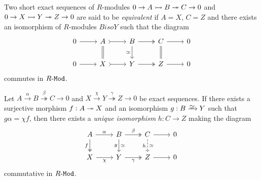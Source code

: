 \begin{definition}
\label{def:equivalent-short-exact-sequences}
Two short exact sequences of \(R\)-modules \(0 \to A \rightarrowtail B \twoheadrightarrow C \to 0\) and \(0 \to X \rightarrowtail Y
\twoheadrightarrow Z \to 0\) are said to be \emph{equivalent} if \(A = X\), \(C = Z\) and
there exists an isomorphism of \(R\)-modules \(B iso Y\) such that the diagram
\[
\begin{tikzcd}
0 \ar[r] &A \ar[r, tail] \ar[d, equal]
&B \ar[r, two heads] \ar[d, "\dis"']
&C \ar[r] \ar[d, equal]
&0 \\
0 \ar[r]
&X \ar[r, tail]
&Y \ar[r, two heads]
&Z \ar[r]
&0
\end{tikzcd}
\]
commutes in \({R\text{-}\texttt{Mod}}\).
\end{definition}

\begin{proposition}
\label{prop:unique-isomorphism-exact-sequences-right}
Let \(A \xrightarrow \alpha B \overset{\beta}\twoheadrightarrow C \to 0\) and
\(X \xrightarrow{\chi} Y \overset{\gamma}\twoheadrightarrow Z \to 0\) be exact
sequences. If there exists a surjective morphism \(f: A \twoheadrightarrow X\) and an
isomorphism \(g: B \isoto Y\) such that \(g \alpha = \chi f\), then there exists
a \emph{unique isomorphism} \(h: C \to Z\) making the diagram
\[
\begin{tikzcd}
A \ar[r, "\alpha"] \ar[d, two heads, "f"']
&B \ar[r, two heads, "\beta"] \ar[d, "g"', "\dis"]
&C \ar[r] \ar[d, dashed, "h"', "\dis"]
&0 \\
X \ar[r, "\chi"'] &Y \ar[r, two heads, "\gamma"'] &Z \ar[r] &0
\end{tikzcd}
\]
commutative in \({R\text{-}\texttt{Mod}}\).
\end{proposition}

